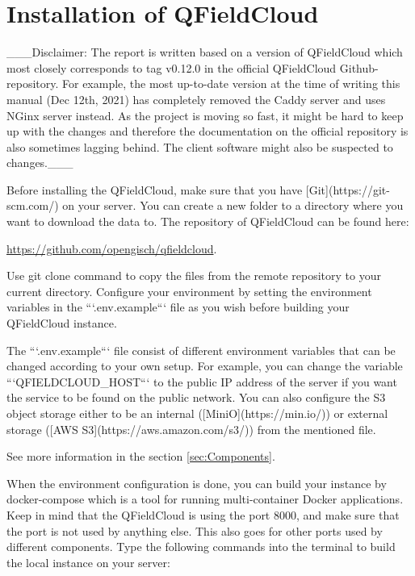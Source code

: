 \documentclass{article}
\begin{document}
\section{Installation of QFieldCloud}\label{sec:install}
\begin{markdown}
___Disclaimer: The report is written based on a version of QFieldCloud which most closely corresponds to tag v0.12.0 in the official QFieldCloud Github-repository. For example, the most up-to-date version at the time of writing this manual (Dec 12th, 2021) has completely removed the Caddy server and uses NGinx server instead. As the project is moving so fast, it might be hard to keep up with the changes and therefore the documentation on the official repository is also sometimes lagging behind. The client software might also be suspected to changes.___

Before installing the QFieldCloud, make sure that you have [Git](https://git-scm.com/) on your server. You can create a new folder to a directory where you want to download the data to. The repository of QFieldCloud can be found here:
\end{markdown} 
\url{https://github.com/opengisch/qfieldcloud}. 
\begin{markdown}
Use git clone command to copy the files from the remote repository to your current directory. Configure your environment by setting the environment variables in the ```.env.example``` file as you wish before building your QFieldCloud instance. 

The ```.env.example``` file consist of different environment variables that can be changed according to your own setup. For example, you can change the variable ```QFIELDCLOUD_HOST``` to the public IP address of the server if you want the service to be found on the public network. You can also configure the S3 object storage either to be an internal ([MiniO](https://min.io/)) or external storage ([AWS S3](https://aws.amazon.com/s3/)) from the mentioned file.
\end{markdown}
See more information in the section \ref{sec:Components}.

When the environment configuration is done, you can build your instance by docker-compose which is a tool for running multi-container Docker applications. Keep in mind that the QFieldCloud is using the port 8000, and make sure that the port is not used by anything else. This also goes for other ports used by different components. Type the following commands into the terminal to build the local instance on your server:
\end{document}

